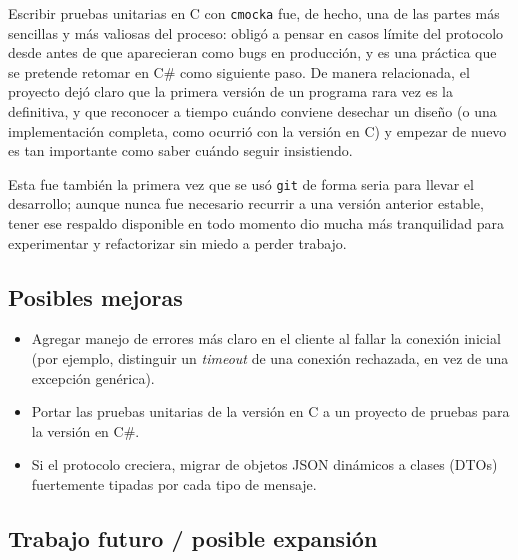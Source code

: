 \documentclass[11pt,letterpaper]{article}
\begin{document}
Escribir pruebas unitarias en C con \texttt{cmocka} fue, de hecho, una de
las partes más sencillas y más valiosas del proceso: obligó a pensar en
casos límite del protocolo desde antes de que aparecieran como bugs en
producción, y es una práctica que se pretende retomar en C\# como
siguiente paso. De manera relacionada, el proyecto dejó claro que la
primera versión de un programa rara vez es la definitiva, y que reconocer a
tiempo cuándo conviene desechar un diseño (o una implementación completa,
como ocurrió con la versión en C) y empezar de nuevo es tan importante
como saber cuándo seguir insistiendo.

Esta fue también la primera vez que se usó \texttt{git} de forma seria
para llevar el desarrollo; aunque nunca fue necesario recurrir a una
versión anterior estable, tener ese respaldo disponible en todo momento dio
mucha más tranquilidad para experimentar y refactorizar sin miedo a perder
trabajo.

\subsection*{Posibles mejoras}

\begin{itemize}
  \item Agregar manejo de errores más claro en el cliente al fallar la
        conexión inicial (por ejemplo, distinguir un \emph{timeout} de una
        conexión rechazada, en vez de una excepción genérica).
  \item Portar las pruebas unitarias de la versión en C a un proyecto de
        pruebas para la versión en C\#.
  \item Si el protocolo creciera, migrar de objetos JSON dinámicos a
        clases (DTOs) fuertemente tipadas por cada tipo de mensaje.
\end{itemize}

\subsection*{Trabajo futuro / posible expansión}
\end{document}
